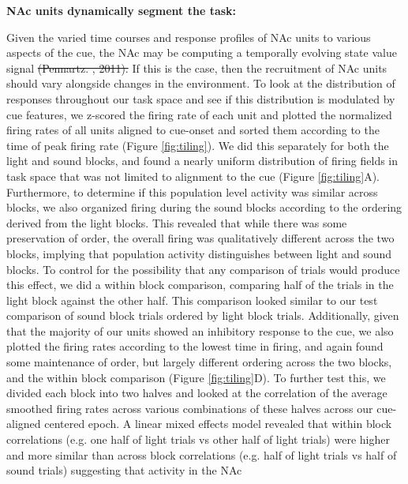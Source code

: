 \documentclass[11pt]{article}
\newcommand{\ldiffentity}[1]{#1}
\providecommand{\DIFadd}[1]{{\protect\color{blue}\uwave{#1}}} %
\providecommand{\DIFdel}[1]{{\protect\color{red}\sout{#1}}}                      %
\providecommand{\DIFaddbegin}{} %
\providecommand{\DIFaddend}{} %
\providecommand{\DIFdelbegin}{} %
\providecommand{\DIFdelend}{} %
\newcommand{\DIFscaledelfig}{0.5}
\newlength{\DIFdelgraphicswidth} %
\newlength{\DIFdelgraphicsheight} %
\newcommand{\DIFaddincludegraphics}[2][]{{\color{blue}\fbox{\DIFOincludegraphics[#1]{#2}}}} %
\newcommand{\DIFdelincludegraphics}[2][]{%
\sbox{\DIFdelgraphicsbox}{\DIFOincludegraphics[#1]{#2}}%
\settoboxwidth{\DIFdelgraphicswidth}{\DIFdelgraphicsbox} %
\settoboxtotalheight{\DIFdelgraphicsheight}{\DIFdelgraphicsbox} %
\scalebox{\DIFscaledelfig}{%
\parbox[b]{\DIFdelgraphicswidth}{\usebox{\DIFdelgraphicsbox}\\[-\baselineskip] \rule{\DIFdelgraphicswidth}{0em}}\llap{\resizebox{\DIFdelgraphicswidth}{\DIFdelgraphicsheight}{%
\setlength{\unitlength}{\DIFdelgraphicswidth}%
\begin{picture}(1,1)%
\thicklines\linethickness{2pt} %
{\color[rgb]{1,0,0}\put(0,0){\framebox(1,1){}}}%
{\color[rgb]{1,0,0}\put(0,0){\line( 1,1){1}}}%
{\color[rgb]{1,0,0}\put(0,1){\line(1,-1){1}}}%
\end{picture}%
}\hspace*{3pt}}} %
} %
\DeclareRobustCommand{\DIFaddbegin}{\DIFOaddbegin \let\includegraphics\DIFaddincludegraphics} %
\DeclareRobustCommand{\DIFaddend}{\DIFOaddend \let\includegraphics\DIFOincludegraphics} %
\DeclareRobustCommand{\DIFdelbegin}{\DIFOdelbegin \let\includegraphics\DIFdelincludegraphics} %
\DeclareRobustCommand{\DIFdelend}{\DIFOaddend \let\includegraphics\DIFOincludegraphics} %
\begin{document}
{\bf NAc units dynamically segment the task:}

Given the varied time courses and response profiles of NAc units to various
aspects of the cue, the NAc may be computing a temporally evolving state value
signal \DIFdelbegin \DIFdel{(Pennartz. , 2011). }\DIFdelend \DIFaddbegin \DIFadd{\ldiffentity{\textit{Pennartz et~al.} [\ldiffentity{2011}]}. }\DIFaddend If this is the case, then the recruitment of NAc units
should vary alongside changes in the environment. To look at the distribution of
responses throughout our task space and see if this distribution is modulated by
cue features, we z-scored the firing rate of each unit and plotted the
normalized firing rates of all units aligned to cue-onset and sorted them
according to the time of peak firing rate (Figure \ref{fig:tiling}). We did this
separately for both the light and sound blocks, and found a nearly uniform
distribution of firing fields in task space that was not limited to alignment to
the cue (Figure \ref{fig:tiling}A). Furthermore, to determine if this population
level activity was similar across blocks, we also organized firing during the
sound blocks according to the ordering derived from the light blocks. This revealed that while there was some preservation of order, the overall firing was qualitatively different
across the two blocks, implying that population activity distinguishes between light and sound blocks. To control for the possibility that any comparison of
trials would produce this effect, we did a within block comparison, comparing
half of the trials in the light block against the other half. This comparison
looked similar to our test comparison of sound block trials ordered by light
block trials. Additionally, given that the majority of our units showed an
inhibitory response to the cue, we also plotted the firing rates according to
the lowest time in firing, and again found some maintenance of order, but
largely different ordering across the two blocks, and the within block
comparison (Figure \ref{fig:tiling}D). To further test this, we divided each
block into two halves and looked at the correlation of the average smoothed
firing rates across various combinations of these halves across our cue-aligned
centered epoch. A linear mixed effects model revealed that within block
correlations (e.g. one half of light trials vs other half of light trials) were
higher and more similar than across block correlations (e.g. half of light
trials vs half of sound trials) suggesting that activity in the NAc
\end{document}
